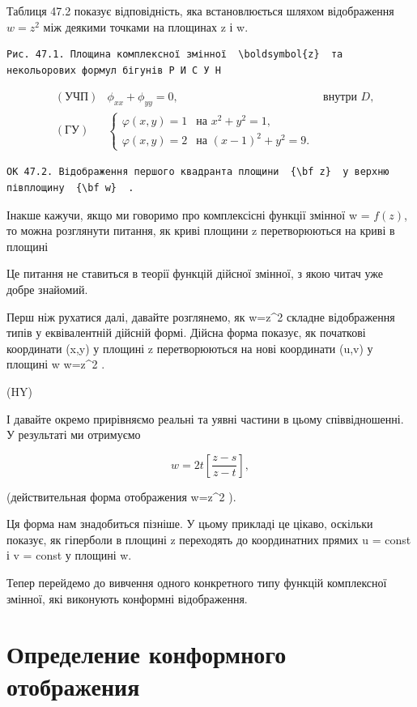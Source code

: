 \documentclass[
  ukrainian,
]{article}
\begin{document}
Таблиця 47.2 показує відповідність, яка встановлюється шляхом
відображення \(w=z^2\) між деякими точками на площинах z і w.

\begin{verbatim}
Рис. 47.1. Площина комплексної змінної  \boldsymbol{z}  та некольорових формул бігунів Р И С У Н
\end{verbatim}

\[
\begin{aligned} & (\text{УЧП}) & \phi_{xx} + \phi_{yy} = 0, & \text{внутри } D, \\ & (\text{ГУ}) & \begin{cases} \varphi(x, y) = 1 & \text{на } x^2 + y^2 = 1, \\ \varphi(x, y) = 2 & \text{на } (x - 1)^2 + y^2 = 9. \end{cases} \end{aligned}
\]

\begin{verbatim}
ОК 47.2. Відображення першого квадранта площини  {\bf z}  у верхню півплощину  {\bf w}  .
\end{verbatim}

Інакше кажучи, якщо ми говоримо про комплексісні функції змінної w =
\(f(z)\), то можна розглянути питання, як криві площини z перетворюються
на криві в площині

Це питання не ставиться в теорії функцій дійсної змінної, з якою читач
уже добре знайомий.

Перш ніж рухатися далі, давайте розглянемо, як w=z\^{}2 складне
відображення типів у еквівалентній дійсній формі. Дійсна форма показує,
як початкові координати (x,y) у площині z перетворюються на нові
координати (u,v) у площині w w=z\^{}2 .

(HY)

І давайте окремо прирівняємо реальні та уявні частини в цьому
співвідношенні. У результаті ми отримуємо

\[
w = 2t \left[ \frac{z-s}{z-t} \right],
\]

(действительная форма отображения w=z\^{}2 ).

Ця форма нам знадобиться пізніше. У цьому прикладі це цікаво, оскільки
показує, як гіперболи в площині z переходять до координатних прямих u =
const і v = const у площині w.

Тепер перейдемо до вивчення одного конкретного типу функцій комплексної
змінної, які виконують конформні відображення.

\section{Определение конформного
отображения}\label{ux43eux43fux440ux435ux434ux435ux43bux435ux43dux438ux435-ux43aux43eux43dux444ux43eux440ux43cux43dux43eux433ux43e-ux43eux442ux43eux431ux440ux430ux436ux435ux43dux438ux44f}
\end{document}
